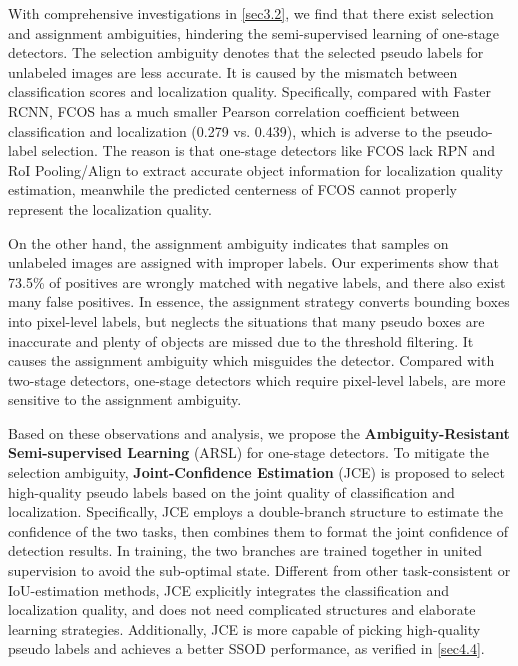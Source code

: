 \documentclass[10pt,twocolumn,letterpaper]{article}
\begin{document}
With comprehensive investigations in \cref{sec3.2}, we find that there exist selection and assignment ambiguities, hindering the semi-supervised learning of one-stage detectors.
The selection ambiguity denotes that the selected pseudo labels for unlabeled images are less accurate.
It is caused by the mismatch between classification scores and localization quality.
Specifically, compared with Faster RCNN, FCOS has a much smaller Pearson correlation coefficient between classification and localization (0.279 vs. 0.439), which is adverse to the pseudo-label selection.
The reason is that one-stage detectors like FCOS lack RPN\cite{FasterRCNN} and RoI Pooling/Align\cite{FasterRCNN, MaskRCNN} to extract accurate object information for localization quality estimation, meanwhile the predicted centerness of FCOS cannot properly represent the localization quality.

On the other hand, the assignment ambiguity indicates that samples on unlabeled images are assigned with improper labels.
Our experiments show that 73.5\% of positives are wrongly matched with negative labels, and there also exist many false positives.
In essence, the assignment strategy converts bounding boxes into pixel-level labels, but neglects the situations that many pseudo boxes are inaccurate and plenty of objects are missed due to the threshold filtering.
It causes the assignment ambiguity which misguides the detector.
Compared with two-stage detectors, one-stage detectors which require pixel-level labels, are more sensitive to the assignment ambiguity.

Based on these observations and analysis, we propose the \textbf{Ambiguity-Resistant Semi-supervised Learning} (ARSL) for one-stage detectors.
To mitigate the selection ambiguity, \textbf{Joint-Confidence Estimation} (JCE) is proposed to select high-quality pseudo labels based on the joint quality of classification and localization.
Specifically, JCE employs a double-branch structure to estimate the confidence of the two tasks, then combines them to format the joint confidence of detection results.
In training, the two branches are trained together in united supervision to avoid the sub-optimal state.
Different from other task-consistent or IoU-estimation methods\cite{Tood,GFL,IoUNet}, JCE explicitly integrates the classification and localization quality, and does not need complicated structures and elaborate learning strategies.
Additionally, JCE is more capable of picking high-quality pseudo labels and achieves a better SSOD performance, as verified in \cref{sec4.4}.
\end{document}
